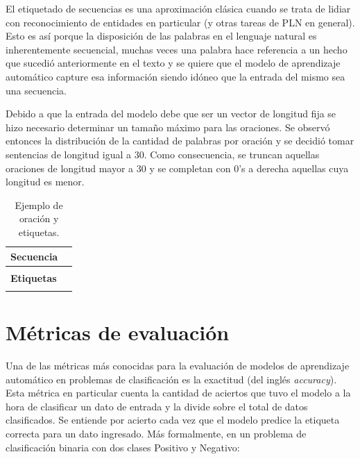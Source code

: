 El etiquetado de secuencias es una aproximación clásica cuando se trata de lidiar con reconocimiento de entidades en particular (y otras tareas de PLN en general). Esto es así porque la disposición de las palabras en el lenguaje natural es inherentemente secuencial, muchas veces una palabra hace referencia a un hecho que sucedió anteriormente en el texto y se quiere que el modelo de aprendizaje automático capture esa información siendo idóneo que la entrada del mismo sea una secuencia.

Debido a que la entrada del modelo debe que ser un vector de longitud fija se hizo necesario determinar un tamaño máximo para las oraciones. Se observó entonces la distribución de la cantidad de palabras por oración y se decidió tomar sentencias de longitud igual a 30. Como consecuencia, se truncan aquellas oraciones de longitud mayor a 30 y se completan con 0's a derecha aquellas cuya longitud es menor.

\begin{table}[ht]
    \centering
    \begin{tabular}{|l|c|}
        \hline
        \textbf{Secuencia} \\
        \hline
        ['It', 'aired', 'on', 'NBC', 'from', 'February', '2002', 'to', 'May', '2003', '.'] \\
        \hline
        \textbf{Etiquetas} \\
        \hline
        [O, O, O, ORG, O, MISC, MISC, O, MISC, MISC, O] \\
        \hline
    \end{tabular}
    \caption{Ejemplo de oración y etiquetas.}
    \label{tab:fragmento:oracion}
\end{table}

\section{Métricas de evaluación}

Una de las métricas más conocidas para la evaluación de modelos de aprendizaje automático en problemas de clasificación es la exactitud (del inglés \textit{accuracy}). Esta métrica en particular cuenta la cantidad de aciertos que tuvo el modelo a la hora de clasificar un dato de entrada y la divide sobre el total de datos clasificados. Se entiende por acierto cada vez que el modelo predice la etiqueta correcta para un dato ingresado. Más formalmente, en un problema de clasificación binaria con dos clases Positivo y Negativo:

